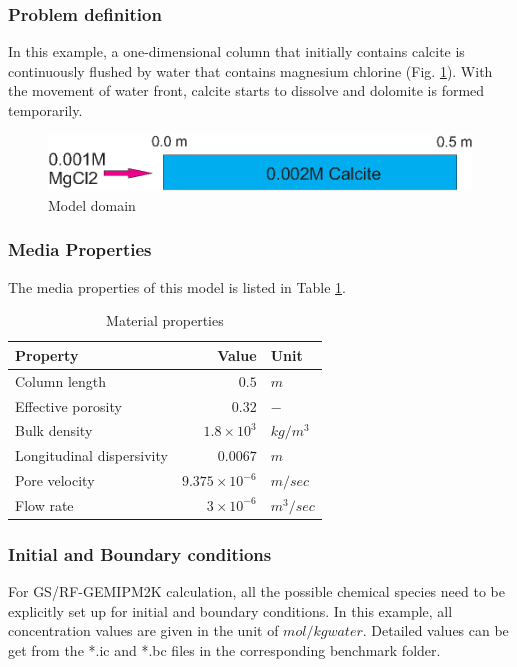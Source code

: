 \subsubsection*{Problem definition}
In this example, a one-dimensional column that initially contains
calcite is continuously flushed by water that contains magnesium
chlorine (Fig. \ref{c:cal_dom}). With the movement of water front,
calcite starts to dissolve and dolomite is formed temporarily.
\begin{figure}[!htb]
  \begin{center}
    \includegraphics[scale=0.5]{C/calcite_domain.eps}
  \end{center}
  \caption{Model domain}
  \label{c:cal_dom}
\end{figure}
\subsubsection*{Media Properties}
The media properties of this model is listed in Table
\ref{tab:c_calcite_mp}.

 \begin{table}[H]
  \begin{center}
  \begin{tabular}{lrl}
\hline\noalign{\smallskip}
  \hline
 Property & Value & Unit \\
  \hline
 Column length & $0.5$ & $m$ \\
 Effective porosity & $0.32$ & $-$ \\
 Bulk density & $1.8\times10^{3}$ & $kg/m^{3}$ \\
 Longitudinal dispersivity & $0.0067$ & $m$ \\
 Pore velocity & $9.375\times10^{-6}$ & $m/sec$ \\
 Flow rate & $3\times10^{-6}$ & $m^{3}/sec$ \\
  \hline
  \hline
  \end{tabular}
  \caption{Material properties} %
  \label{tab:c_calcite_mp}
  \end{center}
  \end{table}

\subsubsection*{Initial and Boundary conditions}
For GS/RF-GEMIPM2K calculation, all the possible chemical species
need to be explicitly set up for initial and boundary conditions. In
this example, all concentration values are given in the unit of
$mol/kg water$. Detailed values can be get from the
*.ic and *.bc files in the corresponding benchmark folder.

